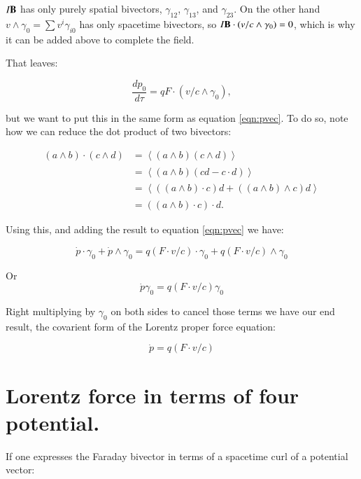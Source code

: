 \documentclass{article}
\newcommand{\gpgrade}[2] {{\left\langle{{#1}}\right\rangle}_{#2}}
\newcommand{\gpgradezero}[1] {\gpgrade{#1}{}}
\begin{document}
$I\mathbf{B}$ has only purely spatial bivectors, $\gamma_{12}$, $\gamma_{13}$, and $\gamma_{23}$.  On the other hand $v \wedge \gamma_0 = \sum v^i \gamma_{i0}$ has only spacetime bivectors, so $I\mathbf{B} \cdot (v/c \wedge \gamma_0) = 0$, which is why it can be added above to complete the field.

That leaves:

\begin{equation}\label{eqn:p0wedgedotwedge}
\frac{dp_0}{d\tau} = q F \cdot \left(v/c \wedge \gamma_0\right),
\end{equation}

but we want to put this in the same form as equation \ref{eqn:pvec}.  To do so, note how we can reduce the dot product of two bivectors:

\begin{align*}
( a \wedge b ) \cdot ( c \wedge d ) 
&= \gpgradezero{ ( a \wedge b ) ( c \wedge d ) } \\
&= \gpgradezero{ ( a \wedge b ) ( c d - c \cdot d ) } \\
&= \gpgradezero{ (( a \wedge b ) \cdot c) d + (( a \wedge b ) \wedge c) d } \\
&= (( a \wedge b ) \cdot c) \cdot d .
\end{align*}

Using this, and adding the result to equation \ref{eqn:pvec} we have:

\begin{equation*}
\dot{p} \cdot \gamma_0 + \dot{p} \wedge \gamma_0 = q (F \cdot v/c) \cdot \gamma_0 + q ( F \cdot v/c ) \wedge \gamma_0
\end{equation*}

Or
\begin{equation*}
\dot{p} \gamma_0 = q (F \cdot v/c) \gamma_0
\end{equation*}

Right multiplying by $\gamma_0$ on both sides to cancel those terms we have our end result, the covarient form of the Lorentz proper force equation:

\begin{equation}\label{eqn:LorentzCovariant}
\dot{p} = q ( F \cdot v/c ) 
\end{equation}

\section{ Lorentz force in terms of four potential. }

If one expresses the Faraday bivector in terms of a spacetime curl of a potential vector:
\end{document}
